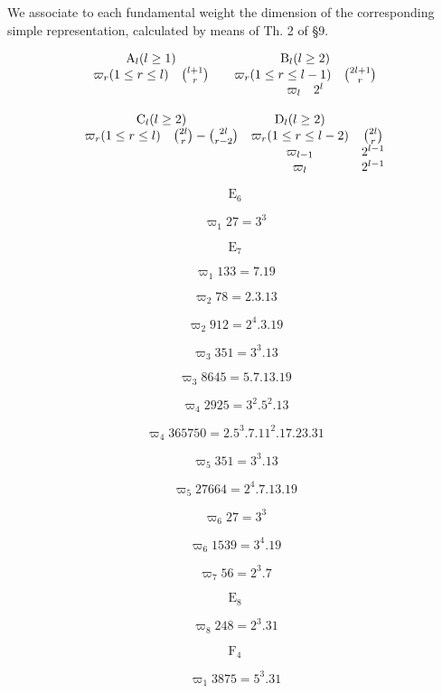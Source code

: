 
We associate to each fundamental weight the dimension of the corresponding simple representation, calculated by means of Th. 2 of §9.

\[
\begin{array}{c c c} \mathrm{A} _ {l} (l \geq 1) & & \mathrm{B} _ {l} (l \geq 2) \\ \varpi_ {r} (1 \leq r \leq l) \quad \binom {l + 1} {r} & & \varpi_ {r} (1 \leq r \leq l - 1) \quad \binom {2 l + 1} {r} \\ & & \varpi_ {l} \quad 2 ^ {l} \end{array}
\]

\[
\begin{array}{c c c} \mathrm{C} _ {l} (l \geq 2) & \mathrm{D} _ {l} (l \geq 2) \\ \varpi_ {r} (1 \leq r \leq l) \quad \binom {2 l} {r} - \binom {2 l} {r - 2} & \varpi_ {r} (1 \leq r \leq l - 2) & \binom {2 l} {r} \\ & \varpi_ {l - 1} & 2 ^ {l - 1} \\ & \varpi_ {l} & 2 ^ {l - 1} \end{array}
\]

\[
\mathrm{E} _ {6}
\]

\[
\varpi_ {1} 27 = 3 ^ {3}
\]

\[
\mathrm{E} _ {7}
\]

\[
\varpi_ {1} 133 = 7.19
\]

\[
\varpi_ {2} 78 = 2.3.13
\]

\[
\varpi_ {2} 912 = 2 ^ {4}.3.19
\]

\[
\varpi_ {3} 351 = 3 ^ {3}.13
\]

\[
\varpi_ {3} 8645 = 5.7.13.19
\]

\[
\varpi_ {4} 2925 = 3 ^ {2}.5 ^ {2}.13
\]

\[
\varpi_ {4} 365750 = 2.5 ^ {3}.7.11 ^ {2}.17.23.31
\]

\[
\varpi_ {5} 351 = 3 ^ {3}.13
\]

\[
\varpi_ {5} 27664 = 2 ^ {4}.7.13.19
\]

\[
\varpi_ {6} 27 = 3 ^ {3}
\]

\[
\varpi_ {6} 1539 = 3 ^ {4}.19
\]

\[
\varpi_ {7} 56 = 2 ^ {3}.7
\]

\[
\mathrm{E} _ {8}
\]

\[
\varpi_ {8} 248 = 2 ^ {3}.31
\]

\[
\mathrm{F} _ {4}
\]

\[
\varpi_ {1} 3875 = 5 ^ {3}.31
\]

